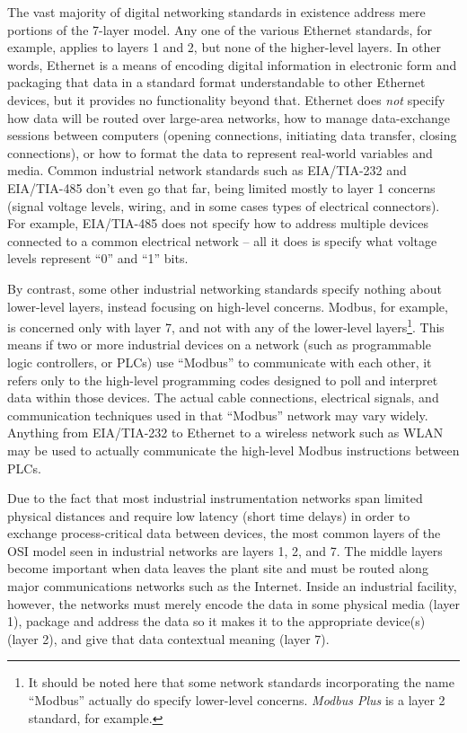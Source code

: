 The vast majority of digital networking standards in existence address mere portions of the 7-layer model.  Any one of the various Ethernet standards, for example, applies to layers 1 and 2, but none of the higher-level layers.  In other words, Ethernet is a means of encoding digital information in electronic form and packaging that data in a standard format understandable to other Ethernet devices, but it provides no functionality beyond that.  Ethernet does \textit{not} specify how data will be routed over large-area networks, how to manage data-exchange sessions between computers (opening connections, initiating data transfer, closing connections), or how to format the data to represent real-world variables and media.  Common industrial network standards such as EIA/TIA-232 and EIA/TIA-485 don't even go that far, being limited mostly to layer 1 concerns (signal voltage levels, wiring, and in some cases types of electrical connectors).  For example, EIA/TIA-485 does not specify how to address multiple devices connected to a common electrical network -- all it does is specify what voltage levels represent ``0'' and ``1'' bits.

By contrast, some other industrial networking standards specify nothing about lower-level layers, instead focusing on high-level concerns.  Modbus, for example, is concerned only with layer 7, and not with any of the lower-level layers\footnote{It should be noted here that some network standards incorporating the name ``Modbus'' actually do specify lower-level concerns.  \textit{Modbus Plus} is a layer 2 standard, for example.}.  This means if two or more industrial devices on a network (such as programmable logic controllers, or PLCs) use ``Modbus'' to communicate with each other, it refers only to the high-level programming codes designed to poll and interpret data within those devices.  The actual cable connections, electrical signals, and communication techniques used in that ``Modbus'' network may vary widely.  Anything from EIA/TIA-232 to Ethernet to a wireless network such as WLAN may be used to actually communicate the high-level Modbus instructions between PLCs. 

Due to the fact that most industrial instrumentation networks span limited physical distances and require low latency (short time delays) in order to exchange process-critical data between devices, the most common layers of the OSI model seen in industrial networks are layers 1, 2, and 7.  The middle layers become important when data leaves the plant site and must be routed along major communications networks such as the Internet.  Inside an industrial facility, however, the networks must merely encode the data in some physical media (layer 1), package and address the data so it makes it to the appropriate device(s) (layer 2), and give that data contextual meaning (layer 7).


